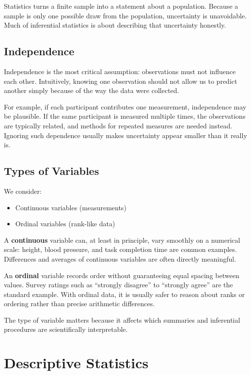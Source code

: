 \documentclass[11pt]{article}
\begin{document}
Statistics turns a finite sample into a statement about a population. Because a sample is only one possible draw from the population, uncertainty is unavoidable. Much of inferential statistics is about describing that uncertainty honestly.

\subsection{Independence}

Independence is the most critical assumption: observations must not influence each other. Intuitively, knowing one observation should not allow us to predict another simply because of the way the data were collected.

For example, if each participant contributes one measurement, independence may be plausible. If the same participant is measured multiple times, the observations are typically related, and methods for repeated measures are needed instead. Ignoring such dependence usually makes uncertainty appear smaller than it really is.

\subsection{Types of Variables}

We consider:
\begin{itemize}
\item Continuous variables (measurements)
\item Ordinal variables (rank-like data)
\end{itemize}

A \textbf{continuous} variable can, at least in principle, vary smoothly on a numerical scale: height, blood pressure, and task completion time are common examples. Differences and averages of continuous variables are often directly meaningful.

An \textbf{ordinal} variable records order without guaranteeing equal spacing between values. Survey ratings such as ``strongly disagree'' to ``strongly agree'' are the standard example. With ordinal data, it is usually safer to reason about ranks or ordering rather than precise arithmetic differences.

The type of variable matters because it affects which summaries and inferential procedures are scientifically interpretable.

\section{Descriptive Statistics}
\end{document}

